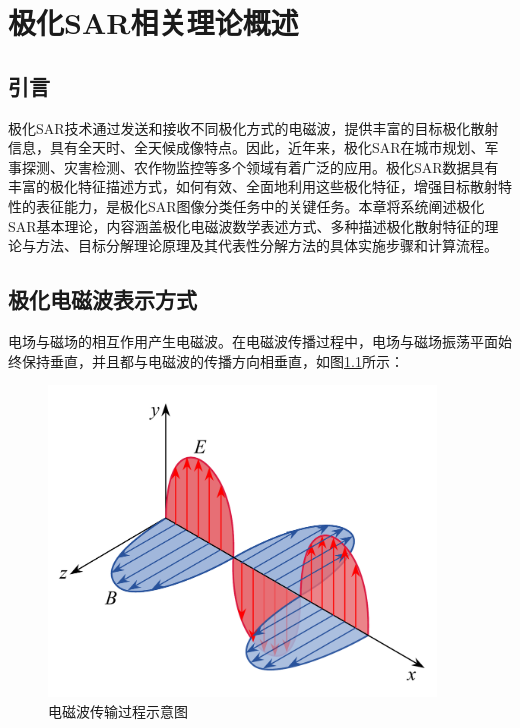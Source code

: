 \chapter{极化SAR相关理论概述}
\section{引言}
极化SAR技术通过发送和接收不同极化方式的电磁波，提供丰富的目标极化散射信息，具有全天时、全天候成像特点。因此，近年来，极化SAR在城市规划、军事探测、灾害检测、农作物监控等多个领域有着广泛的应用。极化SAR数据具有丰富的极化特征描述方式，如何有效、全面地利用这些极化特征，增强目标散射特性的表征能力，是极化SAR图像分类任务中的关键任务。本章将系统阐述极化SAR基本理论，内容涵盖极化电磁波数学表述方式、多种描述极化散射特征的理论与方法、目标分解理论原理及其代表性分解方法的具体实施步骤和计算流程。



\section{极化电磁波表示方式}
电场与磁场的相互作用产生电磁波。在电磁波传播过程中，电场与磁场振荡平面始终保持垂直，并且都与电磁波的传播方向相垂直，如图\ref{电磁波传输过程示意图}所示：

\begin{figure}[h]
    \includegraphics[width=10.3cm]{pic/chapter2/电磁波传输过程.pdf}
    \caption{电磁波传输过程示意图}
    \label{电磁波传输过程示意图}
\end{figure}

